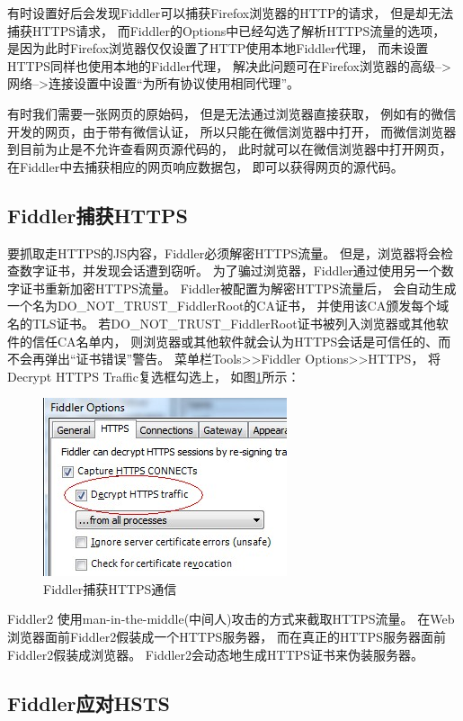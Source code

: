 \documentclass{book}
\begin{document}
有时设置好后会发现Fiddler可以捕获Firefox浏览器的HTTP的请求，
但是却无法捕获HTTPS请求，
而Fiddler的Options中已经勾选了解析HTTPS流量的选项，
是因为此时Firefox浏览器仅仅设置了HTTP使用本地Fiddler代理，
而未设置HTTPS同样也使用本地的Fiddler代理，
解决此问题可在Firefox浏览器的高级-->网络-->连接设置中设置“为所有协议使用相同代理”。

有时我们需要一张网页的原始码，
但是无法通过浏览器直接获取，
例如有的微信开发的网页，由于带有微信认证，
所以只能在微信浏览器中打开，
而微信浏览器到目前为止是不允许查看网页源代码的，
此时就可以在微信浏览器中打开网页，
在Fiddler中去捕获相应的网页响应数据包，
即可以获得网页的源代码。

\subsection{Fiddler捕获HTTPS}

要抓取走HTTPS的JS内容，Fiddler必须解密HTTPS流量。
但是，浏览器将会检查数字证书，并发现会话遭到窃听。
为了骗过浏览器，Fiddler通过使用另一个数字证书重新加密HTTPS流量。
Fiddler被配置为解密HTTPS流量后，
会自动生成一个名为DO\_NOT\_TRUST\_FiddlerRoot的CA证书，
并使用该CA颁发每个域名的TLS证书。
若DO\_NOT\_TRUST\_FiddlerRoot证书被列入浏览器或其他软件的信任CA名单内，
则浏览器或其他软件就会认为HTTPS会话是可信任的、而不会再弹出“证书错误”警告。
菜单栏Tools>>Fiddler Options>>HTTPS，
将Decrypt HTTPS Traffic复选框勾选上，
如图\ref{fig:FiddlerDecryptHttpsTraffic}所示：

\begin{figure}[htbp]
	\centering
	\includegraphics[scale=0.7]{FiddlerDecryptHttpsTraffic.jpg}
	\caption{Fiddler捕获HTTPS通信}
	\label{fig:FiddlerDecryptHttpsTraffic}
\end{figure}

Fiddler2 使用man-in-the-middle(中间人)攻击的方式来截取HTTPS流量。
在Web浏览器面前Fiddler2假装成一个HTTPS服务器，
而在真正的HTTPS服务器面前Fiddler2假装成浏览器。
Fiddler2会动态地生成HTTPS证书来伪装服务器。

\subsection{Fiddler应对HSTS}
\end{document}
